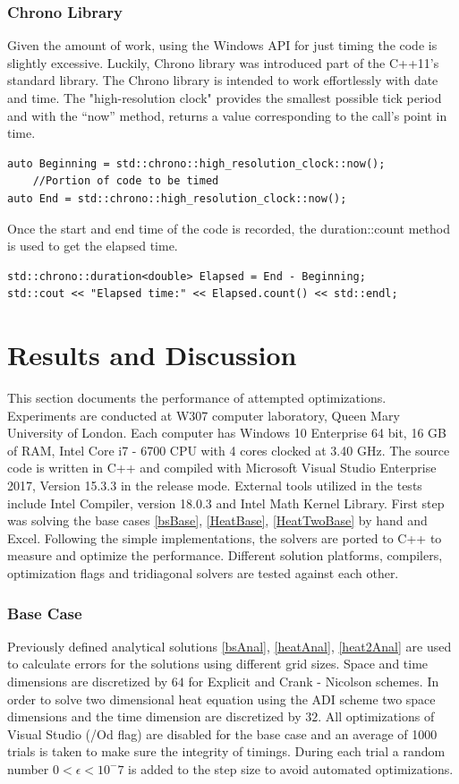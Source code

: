 \documentclass[12pt, oneside]{book}
\theoremstyle{plain}
\theoremstyle{definition}
\begin{document}
\subsection{Chrono Library}
Given the amount of work, using the Windows API for just timing the code is slightly excessive. Luckily, Chrono library was introduced part of the C++11’s standard library. The Chrono library is intended to work effortlessly with date and time. The "high-resolution clock" provides the smallest possible tick period and with the “now” method, returns a value corresponding to the call’s point in time. 
\begin{verbatim}
auto Beginning = std::chrono::high_resolution_clock::now();
    //Portion of code to be timed
auto End = std::chrono::high_resolution_clock::now();
\end{verbatim}
Once the start and end time of the code is recorded, the duration::count method is used to get the elapsed time.
\begin{verbatim}
std::chrono::duration<double> Elapsed = End - Beginning;
std::cout << "Elapsed time:" << Elapsed.count() << std::endl;
\end{verbatim}


\chapter{Results and Discussion}
This section documents the performance of attempted optimizations. Experiments are conducted at W307 computer laboratory, Queen Mary University of London. Each computer has Windows 10 Enterprise 64 bit, 16 GB of RAM, Intel Core i7 - 6700 CPU with 4 cores clocked at 3.40 GHz. The source code is written in C++ and compiled with Microsoft Visual Studio Enterprise 2017, Version 15.3.3 in the release mode. External tools utilized in the tests include Intel Compiler, version 18.0.3 and Intel Math Kernel Library. First step was solving the base cases \ref{bsBase}, \ref{HeatBase}, \ref{HeatTwoBase} by hand and Excel. Following the simple implementations, the solvers are ported to C++ to measure and optimize the performance. Different solution platforms, compilers, optimization flags and tridiagonal solvers are tested against each other.
 
\subsection{Base Case}
Previously defined analytical solutions \ref{bsAnal}, \ref{heatAnal}, \ref{heat2Anal} are used to calculate errors for the solutions using different grid sizes. Space and time dimensions are discretized by $64$ for Explicit and Crank - Nicolson schemes. In order to solve two dimensional heat equation using the ADI scheme two space dimensions and the time dimension are discretized by $32$.  All optimizations of Visual Studio  (/Od flag) are disabled for the base case and an average of 1000 trials is taken to make sure the integrity of timings. During each trial a random number $ 0 < \epsilon < 10^-7 $ is added to the step size to avoid automated optimizations.\\\\\\
\end{document}
